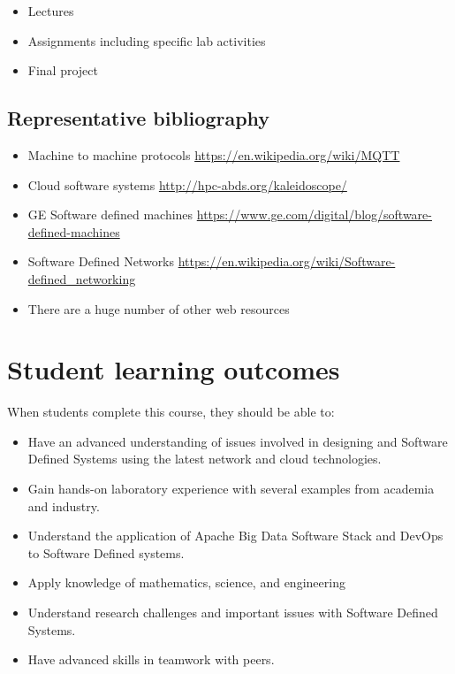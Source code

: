 \begin{itemize}
\item Lectures
\item Assignments including specific lab activities
\item Final project 
\end{itemize}

\subsection{Representative bibliography}

\begin{itemize}
\item	Machine to machine protocols \url{https://en.wikipedia.org/wiki/MQTT}
\item	Cloud software systems \url{http://hpc-abds.org/kaleidoscope/}
\item	GE Software defined machines \url{https://www.ge.com/digital/blog/software-defined-machines}
\item	Software Defined Networks \url{https://en.wikipedia.org/wiki/Software-defined_networking}
\item	There are a huge number of other web resources
\end{itemize}

\section{Student learning outcomes}

When students complete this course, they should be able to:

\begin{itemize}
\item	Have an advanced understanding of issues involved in designing and Software Defined Systems using the latest network and cloud technologies.
\item	Gain hands-on laboratory experience with several examples from academia and industry.
\item	Understand the application of Apache Big Data Software Stack and DevOps to Software Defined systems.
\item	Apply knowledge of mathematics, science, and engineering
\item	Understand research challenges and important issues with Software Defined Systems.
\item	Have advanced skills in teamwork with peers.
\end{itemize}

